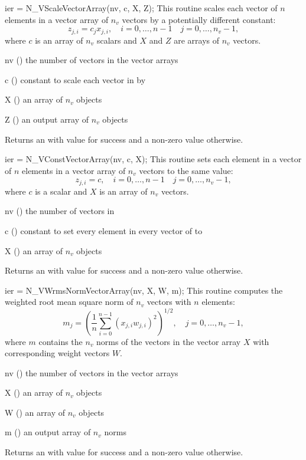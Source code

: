 {
  ier = N\_VScaleVectorArray(nv, c, X, Z);
}
{
  This routine scales each vector of $n$ elements in a vector array of $n_v$
  vectors by a potentially different constant:
  \begin{equation*}
    z_{j,i} = c_j x_{j,i}, \quad i=0,\ldots,n-1 \quad j=0,\ldots,n_v-1,
  \end{equation*}
  where $c$ is an array of $n_v$ scalars and $X$ and $Z$ are arrays of $n_v$
  vectors.
}
{
  \begin{args}[nv]
  \item[nv] () the number of vectors in the vector arrays
  \item[c] () constant to scale each vector in  by
  \item[X] () an array of $n_v$ {\nvector} objects
  \item[Z] () an output array of $n_v$ {\nvector} objects
  \end{args}
}
{
  Returns an  with value  for success and a non-zero value otherwise.
}
{}

{
  ier = N\_VConstVectorArray(nv, c, X);
}
{
  This routine sets each element in a vector of $n$ elements in a vector array of
  $n_v$ vectors to the same value:
  \begin{equation*}
    z_{j,i} = c, \quad i=0,\ldots,n-1 \quad j=0,\ldots,n_v-1,
  \end{equation*}
  where $c$ is a scalar and $X$ is an array of $n_v$ vectors.
}
{
  \begin{args}[nv]
  \item[nv] () the number of vectors in 
  \item[c] () constant to set every element in every
    vector of  to
  \item[X] () an array of $n_v$ {\nvector} objects
  \end{args}
}
{
  Returns an  with value  for success and a non-zero value otherwise.
}
{}

{
  ier = N\_VWrmsNormVectorArray(nv, X, W, m);
}
{
  This routine computes the weighted root mean square norm of $n_v$ vectors with
  $n$ elements:
  \begin{equation*}
    m_j = \left( \frac1n \sum_{i=0}^{n-1} \left(x_{j,i} w_{j,i}\right)^2\right)^{1/2}, \quad j=0,\ldots,n_v-1,
  \end{equation*}
  where $m$ contains the $n_v$ norms of the vectors in the vector array $X$ with
  corresponding weight vectors $W$.
}
{
  \begin{args}[nv]
  \item[nv] () the number of vectors in the vector arrays
  \item[X] () an array of $n_v$ {\nvector} objects
  \item[W] () an array of $n_v$ {\nvector} objects
  \item[m] () an output array of $n_v$ norms
  \end{args}
}
{
  Returns an  with value  for success and a non-zero value otherwise.
}
{}

